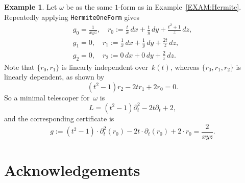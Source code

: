 \documentclass{amsart}
\theoremstyle{definition}
\newtheorem{example}[thm]{Example}
\numberwithin{equation}{section}
\numberwithin{thm}{section}
\begin{document}
	
\begin{example}\label{EXAM:Telescoper}
    Let $\omega$ be as the same $1$-form as in Example~\ref{EXAM:Hermite}. Repeatedly applying \texttt{HermiteOneForm} gives
    \begin{gather*}
    g_0 = \frac{1}{xyz},\quad r_0:= \frac{t}{x} \, dx+ \frac{t}{y} \, dy + \frac{t^2+1}{z}\, dz,\\
    g_1 = 0,\quad r_1:= \frac{1}{x} \, dx+ \frac{1}{y} \, dy + \frac{2t}{z}\, dz,\\
    g_2 = 0,\quad r_2:= 0 \, dx+ 0 \, dy + \frac{2}{z}\, dz.
    \end{gather*}
    Note that $\{ r_0, r_1\}$ is linearly independent over~$k(t)$, whereas $\{ r_0, r_1, r_2\}$ is linearly dependent, as shown by
    \[
        (t^2-1) r_2 -2tr_1 + 2 r_0 =0.
    \]
    So a minimal telescoper for~$\omega$ is 
    \[
        L = (t^2-1)\partial_t^2 - 2t \partial_t + 2 ,
    \]
    and the corresponding certificate is 
    \[
        g := (t^2-1)\cdot \partial_t^2(r_0) -2t \cdot \partial_t(r_0) + 2 \cdot r_0 = \frac{2}{xyz}.
    \]
\end{example}

\section*{Acknowledgements}
\end{document}
